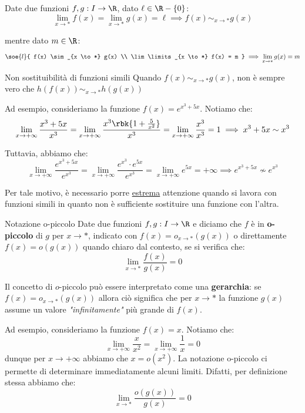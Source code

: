 \documentclass[a4paper, 12pt]{report}
\begin{document}
    \begin{framedobs}{}
        Date due funzioni $f,g : I \to \R$, dato $\ell \in \R-\{0\}$:
        \[\lim_{x \to *} f(x) = \lim_{x \to *} g(x) = \ell \implies f(x) \sim_{x \to *} g(x)\]

        mentre dato $m \in \R$:
        \[\soe{l}{
            f(x) \sim_{x \to *} g(x) \\
            \lim\limits_{x \to *} f(x) = m
        } \implies \lim\limits_{x \to *} g(x) = m\]

    \end{framedobs}

    \begin{framedobs}{Non sostituibilità di funzioni simili}
        Quando $f(x) \sim_{x \to *} g(x)$, non è sempre vero che $h(f(x)) \sim_{x \to *} h(g(x))$
    \end{framedobs}

    Ad esempio, consideriamo la funzione $f(x) = e^{x^3+5x}$. Notiamo che:
    \[\lim_{x \to +\infty} \frac{x^3+5x}{x^3} = \lim_{x \to +\infty} \frac{x^3\rbk{1+\frac{5}{x^2}}}{x^3} = \lim_{x \to +\infty} \frac{x^3}{x^3} = 1 \implies x^3+5x \sim x^3\]
    
    Tuttavia, abbiamo che:
    \[\lim_{x \to +\infty} \frac{e^{x^3+5x}}{e^{x^3}} = \lim_{x \to +\infty} \frac{e^{x^3} \cdot e^{5x}}{e^{x^3}} = \lim_{x \to +\infty} e^{5x} = +\infty \implies e^{x^3+5x} \not\sim e^{x^3}\]
    
    Per tale motivo, è necessario porre \underline{estrema} attenzione quando si lavora con funzioni simili in quanto non è sufficiente sostituire una funzione con l'altra.

    \begin{frameddefn}{Notazione o-piccolo}
        Date due funzioni $f,g : I \to \R$ e diciamo che $f$ è in \textbf{o-piccolo} di $g$ per $x \to *$, indicato con $f(x) = o_{x \to *}(g(x))$ o  direttamente $f(x) = o(g(x))$ quando chiaro dal contesto, se si verifica che:
        \[\lim_{x \to *} \frac{f(x)}{g(x)} = 0\]
    \end{frameddefn}

    Il concetto di $o$-piccolo può essere interpretato come una \textbf{gerarchia}: se $f(x) = o_{x \to *}(g(x))$ allora ciò significa che per $x \to *$ la funzione $g(x)$ assume un valore \textit{"infinitamente"} più grande di $f(x)$.
    
    Ad esempio, consideriamo la funzione $f(x) = x$. Notiamo che:
    \[\lim_{x \to +\infty} \frac{x}{x^2} = \lim_{x \to +\infty} \frac{1}{x} = 0\]
    dunque per $x \to +\infty$ abbiamo che $x = o(x^2)$. La notazione o-piccolo ci permette di determinare immediatamente alcuni limiti. Difatti, per definizione stessa abbiamo che:
    \[\lim_{x \to *} \frac{o(g(x))}{g(x)} = 0\]
\end{document}
